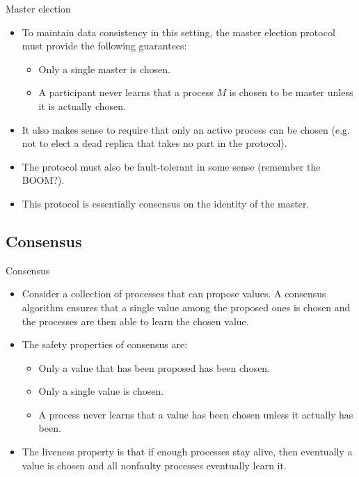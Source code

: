 \documentclass{beamer}
\begin{document}
\begin{frame}{Master election}
  \begin{itemize}
    \item  To maintain data consistency in this setting, the master election protocol \alert{must} provide the following guarantees:
      \begin{itemize}
        \item Only a single master is chosen.
        \item A participant never learns that a process $M$ is chosen to be master unless it is actually chosen.
      \end{itemize}
    \item It also makes sense to require that only an active process can be chosen (e.g. not to elect a dead replica that takes no part in the protocol).
    \item The protocol must also be fault-tolerant in some sense (remember the BOOM?).
    \item This protocol is essentially \alert{consensus} on the identity of the master.
  \end{itemize}
\end{frame}

\subsection{Consensus}
\begin{frame}{Consensus}
  \begin{itemize}
    \item Consider a collection of processes that can propose values. A \alert{consensus} algorithm ensures that a single value among the proposed ones is chosen and the processes are then able to learn the chosen value.
    \item The \alert{safety} properties of consensus are:
      \begin{itemize}
        \item Only a value that has been proposed has been chosen.
        \item Only a single value is chosen.
        \item A process never learns that a value has been chosen unless it actually has been.
      \end{itemize}
    \item The liveness property is that if enough processes stay alive, then eventually a value is chosen and all nonfaulty processes eventually learn it.
  \end{itemize}
\end{frame}
\end{document}
